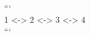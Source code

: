 \documentclass[preview]{standalone}
\begin{document}
```\\1 <-> 2 <-> 3 <-> 4\\```\\
\end{document}
